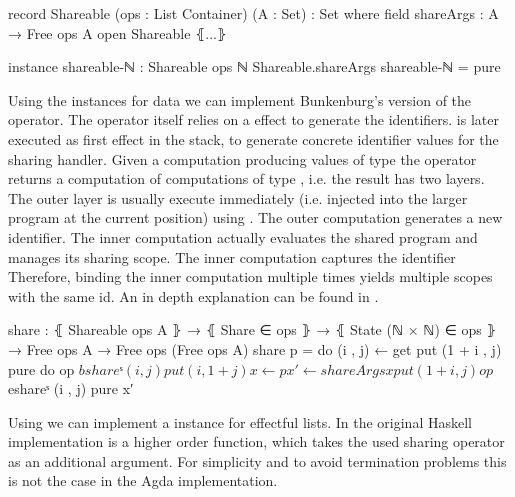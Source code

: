 \begin{code}
record Shareable (ops : List Container) (A : Set) : Set where
  field shareArgs : A → Free ops A
open Shareable ⦃...⦄

instance
  shareable-ℕ : Shareable ops ℕ
  Shareable.shareArgs shareable-ℕ = pure
\end{code}
Using the instances for data we can implement Bunkenburg's version of the
operator.
The operator itself relies on a  effect to generate the
identifiers.
 is later executed as first effect in the stack, to generate
concrete identifier values for the sharing handler.
Given a computation producing values of type  the operator
returns a computation of computations of type , i.e. the result
has two \AgdaSpace{} layers.
The outer layer is usually execute immediately (i.e. injected into the larger
program at the current position) using \AgdaFunction{>>=}.
The outer computation generates a new identifier.
The inner computation actually evaluates the shared program and manages its
sharing scope.
The inner computation captures the identifier
Therefore, binding the inner computation multiple times yields multiple scopes
with the same id.
An in depth explanation can be found in .

\begin{code}
share : ⦃ Shareable ops A ⦄ → ⦃ Share ∈ ops ⦄ → ⦃ State (ℕ × ℕ) ∈ ops ⦄ →
  Free ops A → Free ops (Free ops A)
share p = do (i , j) ← get
             put (1 + i , j)
             pure do op $ bshareˢ (i , j)
                     put (i , 1 + j)
                     x   ← p
                     x′  ← shareArgs x
                     put (1 + i , j)
                     op $ eshareˢ (i , j)
                     pure x′
\end{code}
Using  we can implement a  instance
for effectful lists.
In the original Haskell implementation  is a higher
order function, which takes the used sharing operator as an additional
argument.
For simplicity and to avoid termination problems this is not the case in the
Agda implementation.



